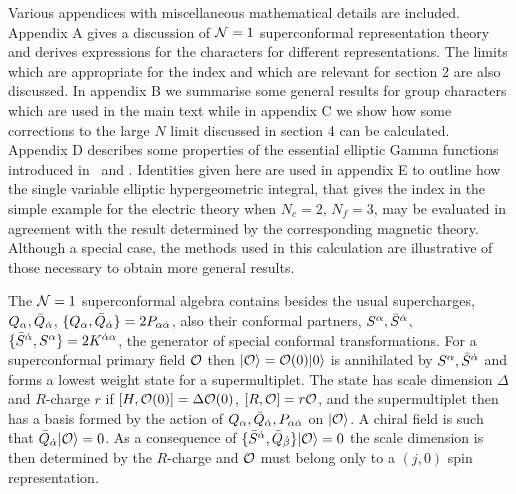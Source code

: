 Various appendices with miscellaneous mathematical details are included.  
Appendix A gives a discussion of
${\cal N}=1$ superconformal representation theory and derives expressions
for the characters for different representations. The limits which are 
appropriate for the index and which are relevant for section 2 are also discussed.
In appendix B we summarise some general results for group characters which are
used in the main text while in appendix C we show how some corrections to the 
large $N$ limit discussed in section 4 can be calculated. 
Appendix D describes some properties of the essential elliptic Gamma functions 
introduced in \eGam\ and . Identities given here are used in appendix E to 
outline how the  single variable elliptic hypergeometric integral,
that gives the index in the  simple example  for the electric theory 
when $N_c=2, \, N_f=3$, may be evaluated 
in agreement with the result determined by the corresponding magnetic theory.
Although a special case, the methods used in this calculation are illustrative of those
necessary to obtain more general results.



The ${\cal N}=1$ superconformal algebra contains besides the usual supercharges,
$ Q_{\alpha}, \bar Q_{\smash {{\dot \alpha}}}$, $\{Q_{\alpha},\bar Q_{\smash {{\dot \alpha}}}\}=
2P_{{\alpha}{\dot \alpha}}$, also their conformal partners, $S^\alpha,  \bar S{}^{{\dot \alpha}}$, 
$\{\bar S{}^{{\dot \alpha}},S^\alpha\} = 2K^{{\dot \alpha}\alpha}$, the generator of special
conformal transformations. For a superconformal primary field ${\cal O}$ then
$|{\cal O}\rangle = {\cal O}(0)|0\rangle$ is annihilated by 
$S^\alpha,  \bar S{}^{{\dot \alpha}}$ and forms a lowest weight state for a supermultiplet.
The state
has scale dimension $\Delta$ and $R$-charge $r$ if $[ H , {\cal O}(0) ] = \Delta {\cal O}(0)$,
$[R, {\cal O} ] = r {\cal O}$, and the supermultiplet then has a basis formed by the action
of $ Q_{\alpha}, \bar Q_{\smash {{\dot \alpha}}}, P_{{\alpha}{\dot \alpha}}$ on $|{\cal O}\rangle$. A chiral
field is such that $\bar Q_{\smash {{\dot \alpha}}} |{\cal O}\rangle = 0$. As a consequence of
$\{ \bar S{}^{{\dot \alpha}} , \bar Q_{\smash {{\dot \beta}}}\}  |{\cal O}\rangle = 0$ the scale dimension is
then determined by the $R$-charge
\eqn{}
and ${\cal O}$ must belong only  to a $(j,0)$ spin representation.

